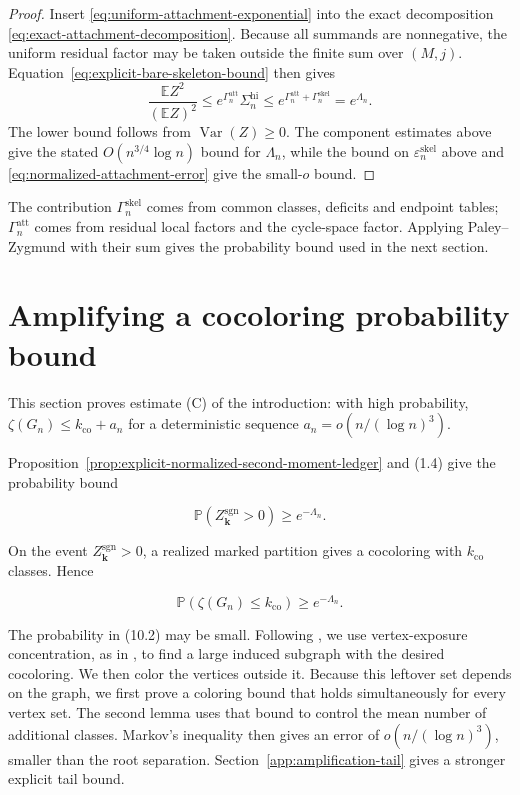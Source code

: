 \documentclass[a4paper,10pt,reqno]{amsart}
\numberwithin{equation}{section}
\newcommand{\Prob}[1]{\mathbb{P}\!\left(#1\right)}
\theoremstyle{plain}
\theoremstyle{remark}
\begin{document}
\begin{proof}
Insert \eqref{eq:uniform-attachment-exponential} into the exact decomposition
\eqref{eq:exact-attachment-decomposition}. Because all summands are
nonnegative, the uniform residual factor may be taken outside the finite
sum over $(M,j)$. Equation~\eqref{eq:explicit-bare-skeleton-bound} then gives
\[
  \frac{\mathbb E Z^2}{(\mathbb E Z)^2}
  \le
  e^{\Gamma_n^{\mathrm{att}}}
  \Sigma_n^{\mathrm{hi}}
  \le
  e^{\Gamma_n^{\mathrm{att}}+\Gamma_n^{\mathrm{skel}}}
  =e^{\Lambda_n}.
\]
The lower bound follows from $\operatorname{Var}(Z)\ge0$.
The component estimates above give the stated $O(n^{3/4}\log n)$ bound
for $\Lambda_n$, while the bound on $\varepsilon_n^{\mathrm{skel}}$ above and
\eqref{eq:normalized-attachment-error} give the small-$o$ bound.
\end{proof}

The contribution $\Gamma_n^{\mathrm{skel}}$ comes from common classes,
deficits and endpoint tables; $\Gamma_n^{\mathrm{att}}$ comes from residual
local factors and the cycle-space factor. Applying Paley--Zygmund with
their sum gives the probability bound used in the next section.
\section{Amplifying a cocoloring probability bound}\label{rare-event-amplification}

This section proves estimate (C) of the introduction: with high
probability, $\zeta(G_n)\le k_{\mathrm{co}}+a_n$ for a deterministic sequence
$a_n=o(n/(\log n)^3)$.

Proposition~\ref{prop:explicit-normalized-second-moment-ledger} and (1.4)
give the probability bound

\[
 \Prob{Z_{\mathbf k}^{\mathrm{sgn}}>0}\ge e^{-\Lambda_n}.       \tag{10.1}
\]

On the event $Z_{\mathbf k}^{\mathrm{sgn}}>0$, a realized marked partition
gives a cocoloring with $k_{\mathrm{co}}$ classes. Hence

\[
 \Prob{\zeta(G_n)\le k_{\mathrm{co}}}\ge e^{-\Lambda_n}.        \tag{10.2}
\]

The probability in (10.2) may be small. Following
\citet[Theorem~1]{heckel-2025-difference}, we use vertex-exposure
concentration, as in \citet[Theorem~1]{scott-2008-2017}, to find a large
induced subgraph with the desired cocoloring. We then color the vertices
outside it. Because this leftover set depends on the graph, we first
prove a coloring bound that holds simultaneously for every vertex set.
The second lemma uses that bound to control the mean number of additional
classes. Markov's inequality then gives an error of $o(n/(\log n)^3)$,
smaller than the root separation. Section~\ref{app:amplification-tail}
gives a stronger explicit tail bound.
\end{document}
